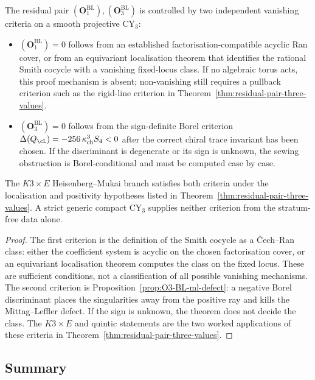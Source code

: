 \begin{corollary}
\label{cor:residual-pair-stratification}
The residual pair
$(\mathbf{O}_1^{\mathrm{BL}}), (\mathbf{O}_3^{\mathrm{BL}})$
is controlled by two independent vanishing criteria on a smooth
projective CY$_3$:
\begin{itemize}[leftmargin=2em]
\item $(\mathbf{O}_1^{\mathrm{BL}})=0$ follows from an established
factorisation-compatible acyclic Ran cover, or from an equivariant
localisation theorem that identifies the rational Smith cocycle with a
vanishing fixed-locus class. If no algebraic torus acts, this proof
mechanism is absent; non-vanishing still requires a pullback criterion such
as the rigid-line criterion in
Theorem~\ref{thm:residual-pair-three-values}.
\item $(\mathbf{O}_3^{\mathrm{BL}})=0$ follows from the sign-definite
Borel criterion $\Delta(Q_\cL)=-256\,\kch^3S_4<0$ after the correct
chiral trace invariant has been chosen. If the discriminant is
degenerate or its sign is unknown, the sewing obstruction is
Borel-conditional and must be computed case by case.
\end{itemize}
The $K3\times E$ Heisenberg--Mukai branch satisfies both criteria under
the localisation and positivity hypotheses listed in
Theorem~\ref{thm:residual-pair-three-values}. A strict generic compact
CY$_3$ supplies neither criterion from the stratum-free data alone.
\end{corollary}

\begin{proof}
The first criterion is the definition of the Smith cocycle as a
\v{C}ech--Ran class: either the coefficient system is acyclic on the
chosen factorisation cover, or an equivariant localisation theorem
computes the class on the fixed locus. These are sufficient conditions,
not a classification of all possible vanishing mechanisms. The second
criterion is Proposition~\ref{prop:O3-BL-ml-defect}: a negative Borel
discriminant places the singularities away from the positive ray and
kills the Mittag--Leffler defect. If the sign is unknown, the theorem
does not decide the class. The $K3\times E$ and quintic statements are
the two worked applications of these criteria in
Theorem~\ref{thm:residual-pair-three-values}.
\end{proof}
\subsection{Summary}
\label{sec:summary}

